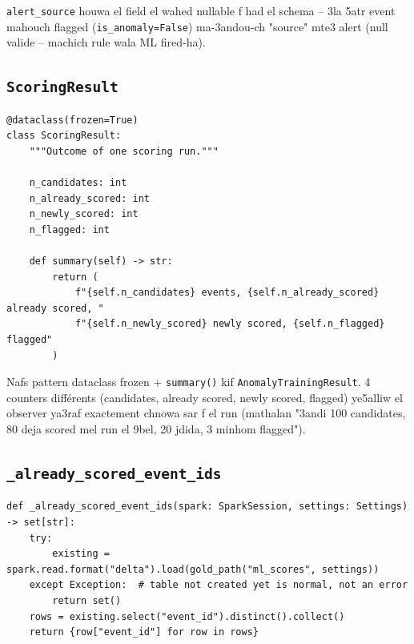 \documentclass[11pt,a4paper]{report}
\DeclareRobustCommand{\code}[1]{\texttt{#1}}
\begin{document}
\code{alert\_source} houwa el field el wahed nullable f had el schema --
3la 5atr event mahouch flagged (\code{is\_anomaly=False}) ma-3andou-ch
"source" mte3 alert (null valide -- machich rule wala ML fired-ha).

\subsection{\code{ScoringResult}}

\begin{lstlisting}[style=pystyle]
@dataclass(frozen=True)
class ScoringResult:
    """Outcome of one scoring run."""

    n_candidates: int
    n_already_scored: int
    n_newly_scored: int
    n_flagged: int

    def summary(self) -> str:
        return (
            f"{self.n_candidates} events, {self.n_already_scored} already scored, "
            f"{self.n_newly_scored} newly scored, {self.n_flagged} flagged"
        )
\end{lstlisting}

Nafs pattern dataclass frozen + \code{summary()} kif \code{AnomalyTrainingResult}.
4 counters différents (candidates, already scored, newly scored, flagged)
ye5alliw el observer ya3raf exactement chnowa sar f el run (mathalan
"3andi 100 candidates, 80 deja scored mel run el 9bel, 20 jdida, 3 minhom
flagged").

\subsection{\code{\_already\_scored\_event\_ids}}

\begin{lstlisting}[style=pystyle]
def _already_scored_event_ids(spark: SparkSession, settings: Settings) -> set[str]:
    try:
        existing = spark.read.format("delta").load(gold_path("ml_scores", settings))
    except Exception:  # table not created yet is normal, not an error
        return set()
    rows = existing.select("event_id").distinct().collect()
    return {row["event_id"] for row in rows}
\end{lstlisting}
\end{document}
